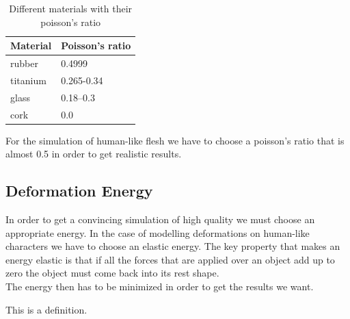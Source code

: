\begin{table}[h!]
\centering
    \begin{tabular}{ | l | l |}
    \hline
    Material & Poisson's ratio \\ \hline
    rubber & 0.4999 \\ \hline
    titanium & 0.265-0.34 \\ \hline
    glass & 0.18–0.3 \\ \hline
    cork & 0.0 \\ \hline
    \end{tabular}
    \caption{Different materials with their poisson's ratio}
\label{table:1}
\end{table}


For the simulation of human-like flesh we have to choose a poisson's ratio that is almost 0.5 in order to get realistic results.
\\ 




\subsection{Deformation Energy}
In order to get a convincing simulation of high quality we must choose an appropriate energy. In the case of modelling deformations on human-like characters we have to choose an elastic energy. The key property that makes an energy elastic is that if all the forces that are applied over an object add up to zero the object must come back into its rest shape.
\\
The energy then has to be minimized in order to get the results we want.

\begin{definition}
  This is a definition.
\end{definition}







